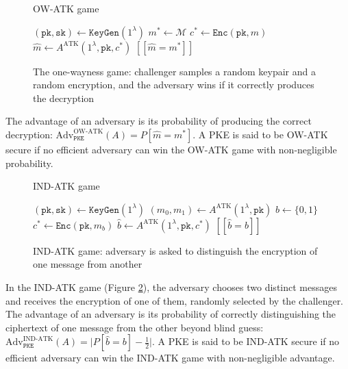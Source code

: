 \documentclass[runningheads]{llncs}
\newcommand{\pke}{\texttt{PKE}}
\newcommand{\keygen}{\texttt{KeyGen}}
\newcommand{\encrypt}{\texttt{Enc}}
\newcommand{\pk}{\texttt{pk}}
\newcommand{\sk}{\texttt{sk}}
\newcommand{\llbrack}{[\![}
\newcommand{\rrbrack}{]\!]}
\begin{document}
\begin{figure}[h]
    \centering
    \begin{minipage}[t]{0.45\textwidth}
    \begin{algorithm}[H]
        \caption*{OW-ATK game}
        \begin{algorithmic}[1]
            \State $(\pk, \sk) \leftarrow \keygen(1^\lambda)$
            \State $m^\ast \leftarrow \mathcal{M}$
            \State $c^\ast \leftarrow \encrypt(\pk, m)$
            \State $\hat{m} \leftarrow A^\text{ATK}(1^\lambda, \pk, c^\ast)$
            \State \Return $\llbrack \hat{m} = m^\ast \rrbrack$
        \end{algorithmic}
    \end{algorithm}
    \end{minipage}
    \caption{The one-wayness game: challenger samples a random keypair and a random encryption, and the adversary wins if it correctly produces the decryption}\label{fig:pke-ow-atk-game}
\end{figure}

The advantage of an adversary is its probability of producing the correct decryption: $\text{Adv}^\text{OW-ATK}_\pke(A) = P[\hat{m} = m^\ast]$. A PKE is said to be OW-ATK secure if no efficient adversary can win the OW-ATK game with non-negligible probability.

\begin{figure}[h]
    \centering
    \begin{minipage}[t]{0.5\textwidth}
        \begin{algorithm}[H]
            \caption*{IND-ATK game}
            \begin{algorithmic}[1]
                \State $(\pk, \sk) \leftarrow \keygen(1^\lambda)$
                \State $(m_0, m_1) \leftarrow A^\text{ATK}(1^\lambda, \pk)$
                \State $b \leftarrow \{0,1\}$
                \State $c^\ast \leftarrow \encrypt(\pk, m_b)$
                \State $\hat{b} \leftarrow A^\text{ATK}(1^\lambda, \pk, c^\ast)$
                \State \Return $\llbrack \hat{b} = b \rrbrack$
            \end{algorithmic}
        \end{algorithm}
    \end{minipage}
    \caption{IND-ATK game: adversary is asked to distinguish the encryption of one message from another}\label{fig:pke-ind-atk-game}
\end{figure}

In the IND-ATK game (Figure \ref{fig:pke-ind-atk-game}), the adversary chooses two distinct messages and receives the encryption of one of them, randomly selected by the challenger. The advantage of an adversary is its probability of correctly distinguishing the ciphertext of one message from the other beyond blind guess: $\text{Adv}^\text{IND-ATK}_\pke(A) = \vert P[\hat{b} = b] - \frac{1}{2}\vert$. A PKE is said to be IND-ATK secure if no efficient adversary can win the IND-ATK game with non-negligible advantage.
\end{document}
